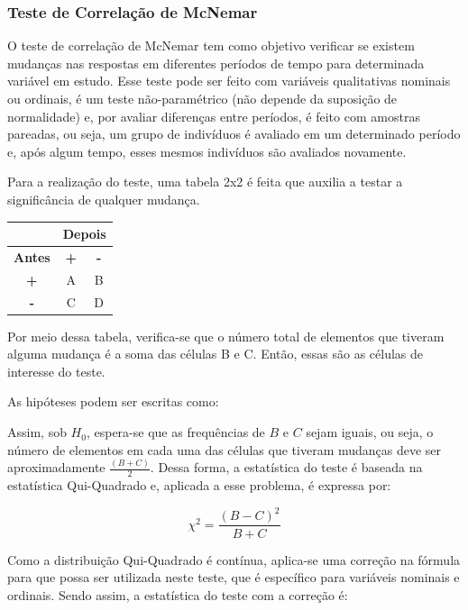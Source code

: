 \documentclass[
]{estat/estat}
\begin{document}
\hypertarget{teste-de-correlauxe7uxe3o-de-mcnemar}{%
\subsubsection{Teste de Correlação de
McNemar}\label{teste-de-correlauxe7uxe3o-de-mcnemar}}

O teste de correlação de McNemar tem como objetivo verificar se existem
mudanças nas respostas em diferentes períodos de tempo para determinada
variável em estudo. Esse teste pode ser feito com variáveis qualitativas
nominais ou ordinais, é um teste não-paramétrico (não depende da
suposição de normalidade) e, por avaliar diferenças entre períodos, é
feito com amostras pareadas, ou seja, um grupo de indivíduos é avaliado
em um determinado período e, após algum tempo, esses mesmos indivíduos
são avaliados novamente.

Para a realização do teste, uma tabela 2x2 é feita que auxilia a testar
a significância de qualquer mudança.

\begin{table}[H]
\centering
\begin{tabular}{c|cc}
\multicolumn{1}{l|}{} & \multicolumn{2}{c}{\textbf{Depois}} \\ 
\midrule
\textbf{Antes}  &\textbf{+} & \textbf{-}    \\ 
\midrule
\textbf{+}      & A         & B     \\
\textbf{-}      & C         & D               
\end{tabular}
\end{table}

Por meio dessa tabela, verifica-se que o número total de elementos que
tiveram alguma mudança é a soma das células B e C. Então, essas são as
células de interesse do teste.

As hipóteses podem ser escritas como:


Assim, sob \(H_{0}\), espera-se que as frequências de \(B\) e \(C\)
sejam iguais, ou seja, o número de elementos em cada uma das células que
tiveram mudanças deve ser aproximadamente
\(\displaystyle\frac{(B + C)}{2}\). Dessa forma, a estatística do teste
é baseada na estatística Qui-Quadrado e, aplicada a esse problema, é
expressa por:

\[ \chi^{2} = \frac{(B - C)^{2}}{B + C} \]

Como a distribuição Qui-Quadrado é contínua, aplica-se uma correção na
fórmula para que possa ser utilizada neste teste, que é específico para
variáveis nominais e ordinais. Sendo assim, a estatística do teste com a
correção é:
\end{document}
